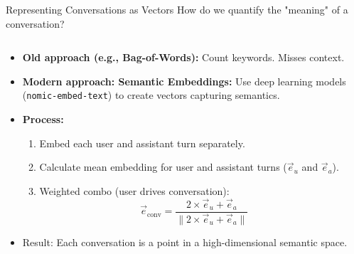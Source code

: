 \documentclass[nodes]{beamer}
\begin{document}
\begin{frame}{Representing Conversations as Vectors}
  How do we quantify the "meaning" of a conversation?
  \begin{columns}[T]
    \begin{column}{0.75\textwidth}
      \begin{itemize}
        \item \textbf{Old approach (e.g., Bag-of-Words):} Count keywords. Misses context.
        \item \textbf{Modern approach: Semantic Embeddings:} Use deep learning models (\texttt{nomic-embed-text}) to create vectors capturing semantics.
        \item \textbf{Process:}
          \begin{enumerate}
            \item Embed each user and assistant turn separately.
            \item Calculate mean embedding for user and assistant turns ($\vec e_u$ and $\vec e_a$).
            \item Weighted combo (user drives conversation):
              \[ \vec{e}_{\text{conv}} = \frac{2 \times \vec{e}_{u} + \vec{e}_{a}}{\lVert 2 \times \vec{e}_{u} + \vec{e}_{a} \rVert} \]
          \end{enumerate}
        \item Result: Each conversation is a point in a high-dimensional semantic space.
      \end{itemize}
    \end{column}
    \begin{column}{0.25\textwidth}
\end{column}
\end{columns}
\end{frame}
\end{document}
